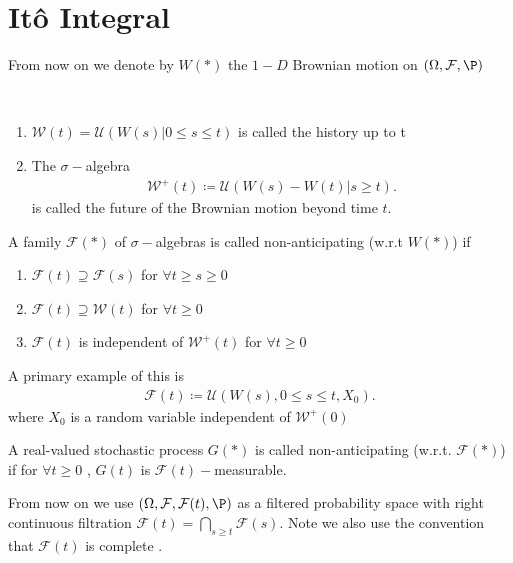 \section{It\^o Integral}
From now on we denote by $W(*)$ the $1-D$ Brownian motion on $(\Omega ,\mathcal{F},\P)$
\begin{definition}
  \hspace{0mm}\\
  \begin{enumerate}
    \item $\mathcal{W}(t) = \mathcal{U}(W(s) | 0 \le s \le t)$ is called the history up to t
    \item The $\sigma-$algebra 
      \begin{align*}
        \mathcal{W}^{+}(t) \coloneqq \mathcal{U}(W(s)-W(t) | s\ge t) 
      .\end{align*}
      is called the future of the Brownian motion beyond time $t$.
  \end{enumerate}
\end{definition}
\begin{definition}
 A family $\mathcal{F}(*)$  of $\sigma-$algebras is called non-anticipating (w.r.t $W(*)$) if 
 \begin{enumerate}
   \item $\mathcal{F}(t) \supseteq \mathcal{F}(s)$ for $\forall t \ge  s \ge 0$ 
   \item $\mathcal{F}(t) \supseteq \mathcal{W}(t)$ for $\forall t \ge 0$ 
   \item $\mathcal{F}(t)$ is independent of $\mathcal{W}^{+}(t) $ for $\forall t \ge 0$ 
 \end{enumerate}
\end{definition}
A primary example of this is 
\begin{align*}
  \mathcal{F}(t) \coloneqq \mathcal{U}(W(s) , 0\le s\le t, X_{0})
.\end{align*}
where $X_{0}$ is a random variable independent of $\mathcal{W}^{+}(0) $
\begin{definition}
 A real-valued stochastic process $G(*)$  is called non-anticipating (w.r.t. $\mathcal{F}(*)$) if 
 for $\forall t \ge  0$ , $G(t)$ is $\mathcal{F}(t)-$measurable.
\end{definition}
\vskip5mm
From now on we use $(\Omega,\mathcal{F},\mathcal{F}(t),\P)$ as a filtered probability space with right continuous filtration 
$\mathcal{F}(t) = \bigcap_{s \ge t} \mathcal{F}(s)$. Note we also use the convention that $\mathcal{F}(t)$ is complete .
